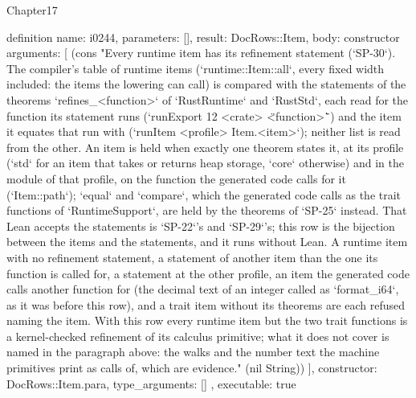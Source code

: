 \begin{lexlean}{Chapter17}
\begin{semanticmodule}
definition{
  name: i0244,
  parameters: [],
  result: DocRows::Item,
  body: constructor{
    arguments: [
      (cons "Every runtime item has its refinement statement (`SP-30`). The compiler's table of runtime items (`runtime::Item::all`, every fixed width included: the items the lowering can call) is compared with the statements of the theorems `refines_<function>` of `RustRuntime` and `RustStd`, each read for the function its statement runs (`runExport 12 <crate> \"<function>\"`) and the item it equates that run with (`runItem <profile> Item.<item>`); neither list is read from the other. An item is held when exactly one theorem states it, at its profile (`std` for an item that takes or returns heap storage, `core` otherwise) and in the module of that profile, on the function the generated code calls for it (`Item::path`); `equal` and `compare`, which the generated code calls as the trait functions of `RuntimeSupport`, are held by the theorems of `SP-25` instead. That Lean accepts the statements is `SP-22`'s and `SP-29`'s; this row is the bijection between the items and the statements, and it runs without Lean. A runtime item with no refinement statement, a statement of another item than the one its function is called for, a statement at the other profile, an item the generated code calls another function for (the decimal text of an integer called as `format_i64`, as it was before this row), and a trait item without its theorems are each refused naming the item. With this row every runtime item but the two trait functions is a kernel-checked refinement of its calculus primitive; what it does not cover is named in the paragraph above: the walks and the number text the machine primitives print as calls of, which are evidence." (nil String))
    ],
    constructor: DocRows::Item.para,
    type_arguments: []
  },
  executable: true
}


\end{semanticmodule}
\end{lexlean}
